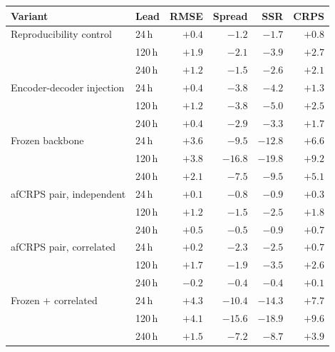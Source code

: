 \documentclass[ms]{agutexSI2019}
\begin{document}
\begin{center}
\small
\begin{tabular}{llrrrr}
\toprule
\textbf{Variant} & \textbf{Lead} & \textbf{RMSE} & \textbf{Spread} & \textbf{SSR} & \textbf{CRPS} \\
\midrule
Reproducibility control & 24\,h & $+0.4$ & $-1.2$ & $-1.7$ & $+0.8$ \\
 & 120\,h & $+1.9$ & $-2.1$ & $-3.9$ & $+2.7$ \\
 & 240\,h & $+1.2$ & $-1.5$ & $-2.6$ & $+2.1$ \\
\midrule
Encoder-decoder injection & 24\,h & $+0.4$ & $-3.8$ & $-4.2$ & $+1.3$ \\
 & 120\,h & $+1.2$ & $-3.8$ & $-5.0$ & $+2.5$ \\
 & 240\,h & $+0.4$ & $-2.9$ & $-3.3$ & $+1.7$ \\
\midrule
Frozen backbone & 24\,h & $+3.6$ & $-9.5$ & $-12.8$ & $+6.6$ \\
 & 120\,h & $+3.8$ & $-16.8$ & $-19.8$ & $+9.2$ \\
 & 240\,h & $+2.1$ & $-7.5$ & $-9.5$ & $+5.1$ \\
\midrule
afCRPS pair, independent & 24\,h & $+0.1$ & $-0.8$ & $-0.9$ & $+0.3$ \\
 & 120\,h & $+1.2$ & $-1.5$ & $-2.5$ & $+1.8$ \\
 & 240\,h & $+0.5$ & $-0.5$ & $-0.9$ & $+0.7$ \\
afCRPS pair, correlated & 24\,h & $+0.2$ & $-2.3$ & $-2.5$ & $+0.7$ \\
 & 120\,h & $+1.7$ & $-1.9$ & $-3.5$ & $+2.6$ \\
 & 240\,h & $-0.2$ & $-0.4$ & $-0.4$ & $+0.1$ \\
\midrule
Frozen $+$ correlated & 24\,h & $+4.3$ & $-10.4$ & $-14.3$ & $+7.7$ \\
 & 120\,h & $+4.1$ & $-15.6$ & $-18.9$ & $+9.6$ \\
 & 240\,h & $+1.5$ & $-7.2$ & $-8.7$ & $+3.9$ \\
\bottomrule
\end{tabular}
\end{center}
\end{document}
